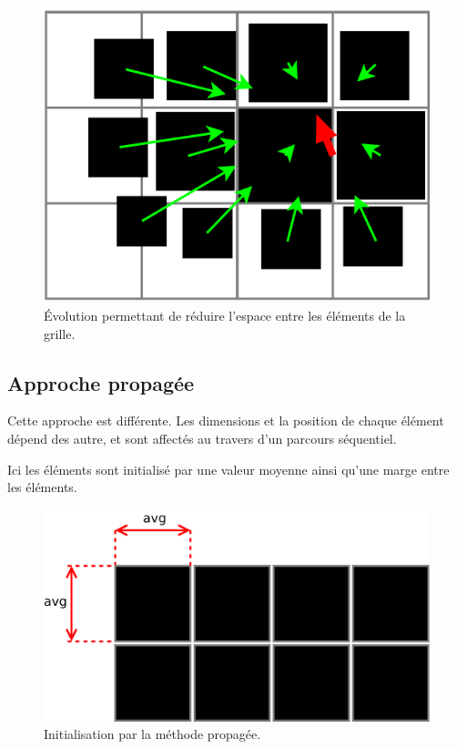 \begin{figure}[H]
  \centering
  \includegraphics[width=\textwidth]{../resources/illustrations/grob_app_evo}
  \caption{Évolution permettant de réduire l'espace entre les éléments de la grille.}
\end{figure}

\subsection{Approche propagée}

Cette approche est différente. Les dimensions et la position de chaque élément dépend des autre, et sont affectés au travers d'un parcours séquentiel.

Ici les éléments sont initialisé par une valeur moyenne ainsi qu'une marge entre les éléments.

\begin{figure}[H]
  \centering
  \includegraphics[width=\textwidth]{../resources/illustrations/seq_app_init}
  \caption{Initialisation par la méthode propagée.}
\end{figure}

